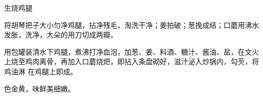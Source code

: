 %
%
%
%
%
%
%
\begin{recipe}{生烧鸡腿}

\ingredients


\preparation

\step 将胡琴把子大小匀净鸡腿，拈净残毛，淘洗干净；姜拍破；葱挽成结；口蘑用沸水
发胀，洗净，大朵的用刀切成两瓣。

\step 用包罐装清水下鸡腿，煮沸打净血泡，加葱、姜、料酒、糖汁、酱油、盐，在文火
上烧至鸡肉离骨，再加入口蘑烧𤆵，即拈入条盘砌好，滋汁泌入炒锅内，勾芡，将鸡油淋
在鸡腿上即成。

\features

色金黄，味鲜美细嫩。

\end{recipe}

